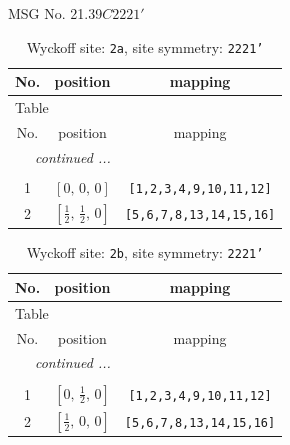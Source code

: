 \documentclass[fleqn,8pt]{jsarticle}
\begin{document}
\setcounter{MaxMatrixCols}{32}

\renewcommand{\tablename}{Table~}
\renewcommand{\figurename}{Figure~}
\begin{center}
\LARGE
MSG No. 21.39\quad$C2221'$
\end{center}
\renewcommand{\arraystretch}{1.2}
\begin{longtable}{ccc}
\caption{Wyckoff site: {\tt 2a}, site symmetry: {\tt 2221'}}
 \\
 \hline \hline
No. & position & mapping \\ \hline \endfirsthead

\multicolumn{2}{l}{\tablename\ \thetable{}} \\
 \hline \hline
No. & position & mapping \\ \hline \endhead

 \hline \hline
\multicolumn{2}{r}{\footnotesize\it continued ...} \\ \endfoot

 \hline \hline
\multicolumn{2}{r}{} \\ \endlastfoot

1 & $\left[ 0,\, 0,\, 0 \right]$ & {\tt [1,2,3,4,9,10,11,12]} \\ \hline
2 & $\left[ \frac{1}{2},\, \frac{1}{2},\, 0 \right]$ & {\tt [5,6,7,8,13,14,15,16]} \\
\end{longtable}
\renewcommand{\arraystretch}{1.2}
\begin{longtable}{ccc}
\caption{Wyckoff site: {\tt 2b}, site symmetry: {\tt 2221'}}
 \\
 \hline \hline
No. & position & mapping \\ \hline \endfirsthead

\multicolumn{2}{l}{\tablename\ \thetable{}} \\
 \hline \hline
No. & position & mapping \\ \hline \endhead

 \hline \hline
\multicolumn{2}{r}{\footnotesize\it continued ...} \\ \endfoot

 \hline \hline
\multicolumn{2}{r}{} \\ \endlastfoot

1 & $\left[ 0,\, \frac{1}{2},\, 0 \right]$ & {\tt [1,2,3,4,9,10,11,12]} \\ \hline
2 & $\left[ \frac{1}{2},\, 0,\, 0 \right]$ & {\tt [5,6,7,8,13,14,15,16]} \\
\end{longtable}
\end{document}

